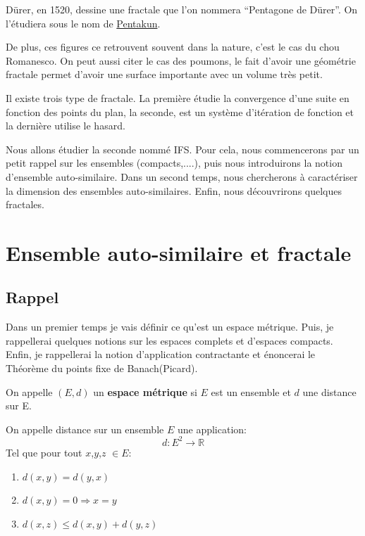 \documentclass[a4paper, 12pt]{report}
\begin{document}
		\hspace{.7 cm} Dürer, en 1520, dessine une fractale que l'on nommera ``Pentagone de Dürer''. On l'étudiera sous le nom de \hyperref[Pentakun]{Pentakun}. 
		
		
		\hspace{.7 cm} De plus,  ces figures ce retrouvent souvent dans la nature,  c'est le cas du chou Romanesco. On peut aussi citer le cas des poumons, le fait d'avoir une géométrie fractale permet d'avoir une surface importante avec un volume très petit.
		
		\hspace{.7 cm} Il existe trois type de fractale. La première étudie la convergence d'une suite en fonction des points du plan, la seconde, est un système d'itération de fonction et la dernière utilise le hasard.
		
		\hspace{.7 cm}Nous allons étudier la seconde nommé IFS. Pour cela, nous commencerons par un petit rappel sur les ensembles (compacts,....), puis nous introduirons la notion d'ensemble auto-similaire. Dans un second temps, nous chercherons à caractériser la dimension des ensembles auto-similaires. Enfin, nous découvrirons quelques fractales.	
	
	\chapter{\bf Ensemble auto-similaire et fractale}
		\section{Rappel}
			Dans un premier temps je vais définir ce qu'est un espace métrique. Puis, je rappellerai quelques notions sur les espaces complets et d'espaces compacts. Enfin, je rappellerai la notion d'application contractante et énoncerai le Théorème du points fixe de Banach(Picard).
			
			\begin{definition}
				On appelle $(E,d)$ un \textbf{espace métrique} si $E$ est un ensemble et $d$ une distance sur E.
				
				On appelle distance sur un ensemble $E$ une application:
				\begin{equation*}
					d:E^2\longrightarrow \mathds{R}
				\end{equation*}
			Tel que pour tout $x$,$y$,$z$ $\in E$:
				\begin{enumerate}\itemsep2pt
					\item $d(x,y)=d(y,x)$
					\item $d(x,y)=0 \Longrightarrow x=y$
					\item $d(x,z) \leq d(x,y)+d(y,z)$
				\end{enumerate}
			\end{definition}
			
\end{document}

